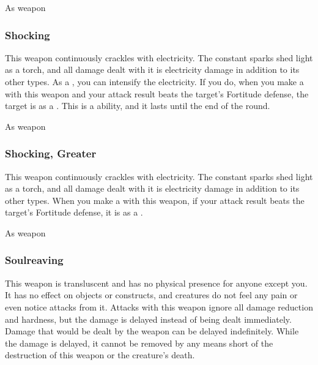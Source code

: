  As weapon


\lowercase{\hypertarget{item:Shocking}{}}\label{item:Shocking}
\hypertarget{item:Shocking}{\subsubsection{Shocking\hfill{}}}

This weapon continuously crackles with electricity.
The constant sparks shed light as a torch, and all damage dealt with it is electricity damage in addition to its other types.
As a , you can intensify the electricity.
If you do, when you make a  with this weapon and your attack result beats the target's Fortitude defense, the target is \dazed as a .
This is a  ability, and it lasts until the end of the round.



 


 As weapon


\lowercase{\hypertarget{item:Shocking, Greater}{}}\label{item:Shocking, Greater}
\hypertarget{item:Shocking, Greater}{\subsubsection{Shocking, Greater\hfill{}}}

This weapon continuously crackles with electricity.
The constant sparks shed light as a torch, and all damage dealt with it is electricity damage in addition to its other types.
When you make a  with this weapon, if your attack result beats the target's Fortitude defense, it is \dazed as a .



 


 As weapon


\lowercase{\hypertarget{item:Soulreaving}{}}\label{item:Soulreaving}
\hypertarget{item:Soulreaving}{\subsubsection{Soulreaving\hfill{}}}

This weapon is transluscent and has no physical presence for anyone except you.
It has no effect on objects or constructs, and creatures do not feel any pain or even notice attacks from it.
Attacks with this weapon ignore all damage reduction and hardness, but the damage is delayed instead of being dealt immediately.
Damage that would be dealt by the weapon can be delayed indefinitely.
While the damage is delayed, it cannot be removed by any means short of the destruction of this weapon or the creature's death.

